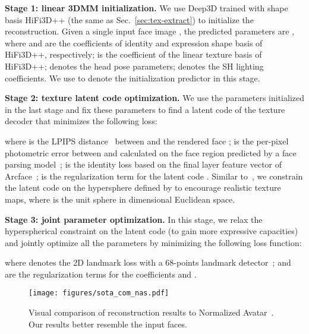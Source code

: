 \documentclass[10pt,twocolumn,letterpaper]{article}
\begin{document}
\vspace{1mm}
\noindent\textbf{Stage 1: linear 3DMM initialization.}
We use Deep3D \cite{deng2019accurate} trained with shape basis HiFi3D++ \cite{chai2022realy} (the same as Sec.~\ref{sec:tex-extract}) to initialize the reconstruction. 
Given a single input face image , the predicted parameters are , where  and  are the coefficients of identity and expression shape basis of HiFi3D++, respectively;  is the coefficient of the linear texture basis of HiFi3D++;  denotes the head pose parameters;  denotes the SH lighting coefficients.
We use  to denote the initialization predictor in this stage. 


\vspace{1mm}
\noindent\textbf{Stage 2: texture latent code  optimization.}
We use the parameters  initialized in the last stage and fix these parameters to find a latent code  of the texture decoder that minimizes the following loss:

where  is the LPIPS distance~\cite{zhang2018unreasonable} between  and the rendered face ; 
 is the per-pixel  photometric error between  and  calculated on the face region predicted by a face parsing model~\cite{zllrunningfaceparsing};
 is the identity loss based on the final layer feature vector of Arcface~\cite{deng2019arcface};
 is the regularization term for the latent code . 
Similar to~\cite{menon2020pulse}, we constrain the latent code  on the hypersphere defined by  to encourage realistic texture maps, where  is the unit sphere in  dimensional Euclidean space.


\vspace{1mm}
\noindent\textbf{Stage 3: joint parameter optimization.}
In this stage, we relax the hyperspherical constraint on the latent code  (to gain more expressive capacities) and jointly optimize all the parameters  by minimizing the following loss function:

where  denotes the 2D landmark loss with a 68-points landmark detector~\cite{bulat2017far};
 and  are the regularization terms for the coefficients  and .



\begin{figure}[!t]
  \centering
   \texttt{[image: figures/sota\_com\_nas.pdf]}
   \caption{Visual comparison of reconstruction results to Normalized Avatar~\cite{luo2021normalized}. Our results better resemble the input faces.}
   \label{fig:sota-com-nas}
\end{figure}
\end{document}
